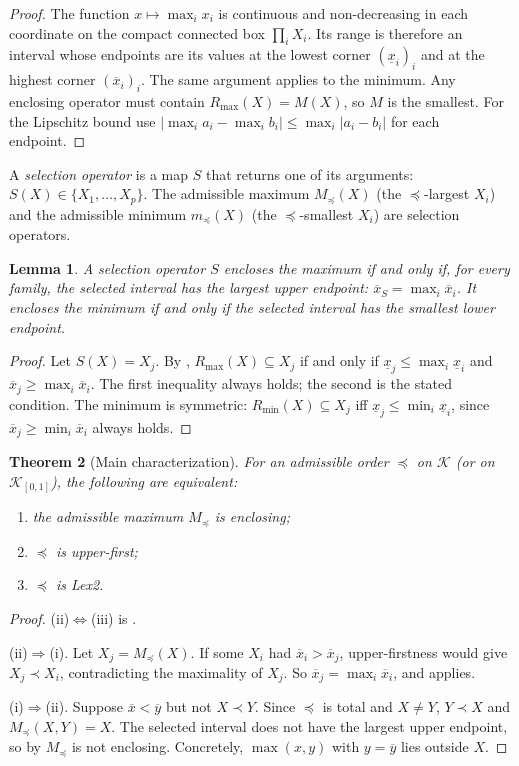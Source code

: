 \documentclass[preprint,12pt]{elsarticle}
\newtheorem{theorem}{Theorem}[section]
\newtheorem{lemma}[theorem]{Lemma}
\theoremstyle{definition}
\newcommand{\K}{\mathcal{K}}
\newcommand{\lo}[1]{\underline{#1}}
\newcommand{\up}[1]{\overline{#1}}
\newcommand{\abs}[1]{\lvert #1\rvert}
\begin{document}
\begin{proof}
The function $x\mapsto\max_ix_i$ is continuous and non-decreasing in each coordinate on the compact connected box $\prod_iX_i$. Its range is therefore an interval whose endpoints are its values at the lowest corner $(\lo x_i)_i$ and at the highest corner $(\up x_i)_i$. The same argument applies to the minimum. Any enclosing operator must contain $R_{\max}(X)=M(X)$, so $M$ is the smallest. For the Lipschitz bound use $\abs{\max_ia_i-\max_ib_i}\le\max_i\abs{a_i-b_i}$ for each endpoint.
\end{proof}

A \emph{selection operator} is a map $S$ that returns one of its arguments: $S(X)\in\{X_1,\dots,X_p\}$. The admissible maximum $M_\preceq(X)$ (the $\preceq$-largest $X_i$) and the admissible minimum $m_\preceq(X)$ (the $\preceq$-smallest $X_i$) are selection operators.

\begin{lemma}\label{lem:selection}
A selection operator $S$ encloses the maximum if and only if, for every family, the selected interval has the largest upper endpoint: $\up x_{S}=\max_i\up x_i$. It encloses the minimum if and only if the selected interval has the smallest lower endpoint.
\end{lemma}

\begin{proof}
Let $S(X)=X_j$. By , $R_{\max}(X)\subseteq X_j$ if and only if $\lo x_j\le\max_i\lo x_i$ and $\up x_j\ge\max_i\up x_i$. The first inequality always holds; the second is the stated condition. The minimum is symmetric: $R_{\min}(X)\subseteq X_j$ iff $\lo x_j\le\min_i\lo x_i$, since $\up x_j\ge\min_i\up x_i$ always holds.
\end{proof}

\begin{theorem}[Main characterization]\label{thm:char}
For an admissible order $\preceq$ on $\K$ (or on $\K_{[0,1]}$), the following are equivalent:
\begin{enumerate}[label=(\roman*)]
\item the admissible maximum $M_\preceq$ is enclosing;
\item $\preceq$ is upper-first;
\item $\preceq$ is Lex2.
\end{enumerate}
\end{theorem}

\begin{proof}
(ii)$\Leftrightarrow$(iii) is .

(ii)$\Rightarrow$(i). Let $X_j=M_\preceq(X)$. If some $X_i$ had $\up x_i>\up x_j$, upper-firstness would give $X_j\prec X_i$, contradicting the maximality of $X_j$. So $\up x_j=\max_i\up x_i$, and  applies.

(i)$\Rightarrow$(ii). Suppose $\up x<\up y$ but not $X\prec Y$. Since $\preceq$ is total and $X\ne Y$, $Y\prec X$ and $M_\preceq(X,Y)=X$. The selected interval does not have the largest upper endpoint, so by  $M_\preceq$ is not enclosing. Concretely, $\max(x,y)$ with $y=\up y$ lies outside $X$.
\end{proof}
\end{document}

